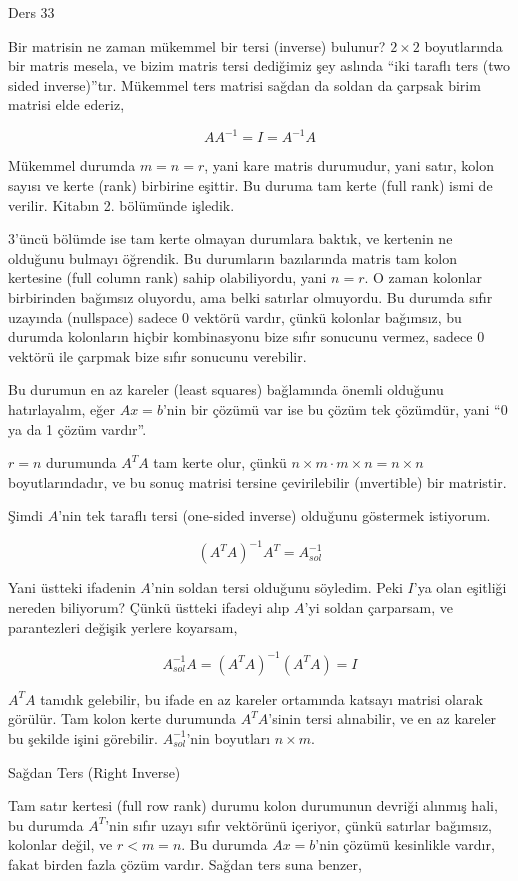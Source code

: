 \documentclass[12pt,fleqn]{article}\usepackage{../../common}
\begin{document}
Ders 33

Bir matrisin ne zaman mükemmel bir tersi (inverse) bulunur? $2 \times 2$
boyutlarında bir matris mesela, ve bizim matris tersi dediğimiz şey aslında
``iki taraflı ters (two sided inverse)''tır. Mükemmel ters matrisi sağdan
da soldan da çarpsak birim matrisi elde ederiz,

$$ A A^{-1} = I = A^{-1}A $$

Mükemmel durumda $m = n = r$, yani kare matris durumudur, yani satır, kolon
sayısı ve kerte (rank) birbirine eşittir. Bu duruma tam kerte (full rank)
ismi de verilir. Kitabın 2. bölümünde işledik.

3'üncü bölümde ise tam kerte olmayan durumlara baktık, ve kertenin ne
olduğunu bulmayı öğrendik. Bu durumların bazılarında matris tam kolon
kertesine (full column rank) sahip olabiliyordu, yani $n = r$. O zaman
kolonlar birbirinden bağımsız oluyordu, ama belki satırlar olmuyordu. Bu
durumda sıfır uzayında (nullspace) sadece 0 vektörü vardır, çünkü kolonlar
bağımsız, bu durumda kolonların hiçbir kombinasyonu bize sıfır sonucunu
vermez, sadece 0 vektörü ile çarpmak bize sıfır sonucunu verebilir.

Bu durumun en az kareler (least squares) bağlamında önemli olduğunu
hatırlayalım, eğer $Ax = b$'nin bir çözümü var ise bu çözüm tek çözümdür,
yani ``0 ya da 1 çözüm vardır''.

$r=n$ durumunda $A^TA$ tam kerte olur, çünkü $n \times m \cdot m \times
n = n \times n$  boyutlarındadır, ve bu sonuç matrisi tersine çevirilebilir
(ınvertible) bir matristir.

Şimdi $A$'nin tek taraflı tersi (one-sided inverse) olduğunu göstermek
istiyorum.

$$ (A^TA)^{-1} A^T = A_{sol}^{-1} $$

Yani üstteki ifadenin $A$'nin soldan tersi olduğunu söyledim. Peki $I$'ya
olan eşitliği nereden biliyorum? Çünkü üstteki ifadeyi alıp $A$'yi soldan
çarparsam, ve parantezleri değişik yerlere koyarsam,

$$  A_{sol}^{-1} A  = (A^TA)^{-1} (A^TA) = I$$

$A^TA$ tanıdık gelebilir, bu ifade en az kareler ortamında katsayı matrisi
olarak görülür. Tam kolon kerte durumunda $A^TA$'sinin tersi alınabilir, ve
en az kareler bu şekilde işini görebilir.  $A_{sol}^{-1}$'nin boyutları $n
\times m$.

Sağdan Ters (Right Inverse)

Tam satır kertesi (full row rank) durumu kolon durumunun devriği alınmış
hali, bu durumda $A^T$'nin sıfır uzayı sıfır vektörünü içeriyor, çünkü
satırlar bağımsız, kolonlar değil, ve $r < m = n$. Bu durumda $Ax = b$'nin
çözümü kesinlikle vardır, fakat birden fazla çözüm vardır. Sağdan ters suna
benzer, 
\end{document}
